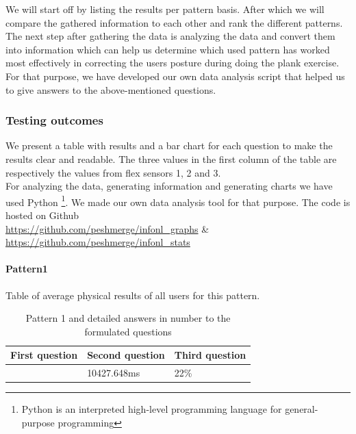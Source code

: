 \documentclass[sigconf]{acmart}
\begin{document}
We will start off by listing the results per pattern basis. After which we will compare the gathered information to each other and rank the different patterns. The next step after gathering the data is analyzing the data and convert them into information which can help us determine which used pattern has worked most effectively in correcting the user\textquotesingle s posture during doing the plank exercise. For that purpose, we have developed our own data analysis script that helped us to give answers to the above{-}mentioned questions. 

\subsubsection{Testing outcomes} 
We present a table with results and a bar chart for each question to make the results clear and readable. The three values in the first column of the table are respectively the values from flex sensors 1, 2 and 3.\\

For analyzing the data, generating information and generating charts we have used Python \footnote{Python is an interpreted high{-}level programming language for general{-}purpose programming}. We made our own data analysis tool for that purpose. 
The code is hosted on Github \\ 
\url{https://github.com/peshmerge/infonl_graphs} \& \\
\url{https://github.com/peshmerge/infonl_stats} 


\paragraph {Pattern1}
Table of average physical results of all users for this pattern.
\begin{table}[h]
\caption{Pattern 1 and detailed answers in number to the formulated questions}
\label{my-label}
\begin{tabular}{|l|l|l|}
\hline
\multicolumn{1}{|c|}{\textbf{First question}} & \multicolumn{1}{c|}{\textbf{Second question}} & \multicolumn{1}{c|}{\textbf{Third question}} \\ \hline
 [43.0,28.0,32.0]& 10427.648ms & 22\%  \\ \hline
\end{tabular}
\end{table}
\end{document}
